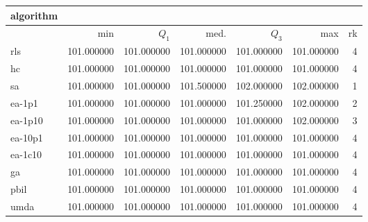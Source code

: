 \begin{tabular}{@{}l*{5}{>{{}}N{3}{0}}>{{}}N{2}{0}@{}}
\toprule
{algorithm} &  \\
\midrule
& {min} & {$Q_1$} & {med.} & {$Q_3$} & {max} & {rk}\\
\midrule
rls & {\color{blue}} 101.000000 & {\color{blue}} 101.000000 & 101.000000 & 101.000000 & 101.000000 & 4\\
hc & {\color{blue}} 101.000000 & {\color{blue}} 101.000000 & 101.000000 & 101.000000 & 101.000000 & 4\\
sa & {\color{blue}} 101.000000 & {\color{blue}} 101.000000 & {\color{blue}} 101.500000 & {\color{blue}} 102.000000 & {\color{blue}} 102.000000 & 1\\
ea-1p1 & {\color{blue}} 101.000000 & {\color{blue}} 101.000000 & 101.000000 & 101.250000 & {\color{blue}} 102.000000 & 2\\
ea-1p10 & {\color{blue}} 101.000000 & {\color{blue}} 101.000000 & 101.000000 & 101.000000 & {\color{blue}} 102.000000 & 3\\
ea-10p1 & {\color{blue}} 101.000000 & {\color{blue}} 101.000000 & 101.000000 & 101.000000 & 101.000000 & 4\\
ea-1c10 & {\color{blue}} 101.000000 & {\color{blue}} 101.000000 & 101.000000 & 101.000000 & 101.000000 & 4\\
ga & {\color{blue}} 101.000000 & {\color{blue}} 101.000000 & 101.000000 & 101.000000 & 101.000000 & 4\\
pbil & {\color{blue}} 101.000000 & {\color{blue}} 101.000000 & 101.000000 & 101.000000 & 101.000000 & 4\\
umda & {\color{blue}} 101.000000 & {\color{blue}} 101.000000 & 101.000000 & 101.000000 & 101.000000 & 4\\
\bottomrule
\end{tabular}
